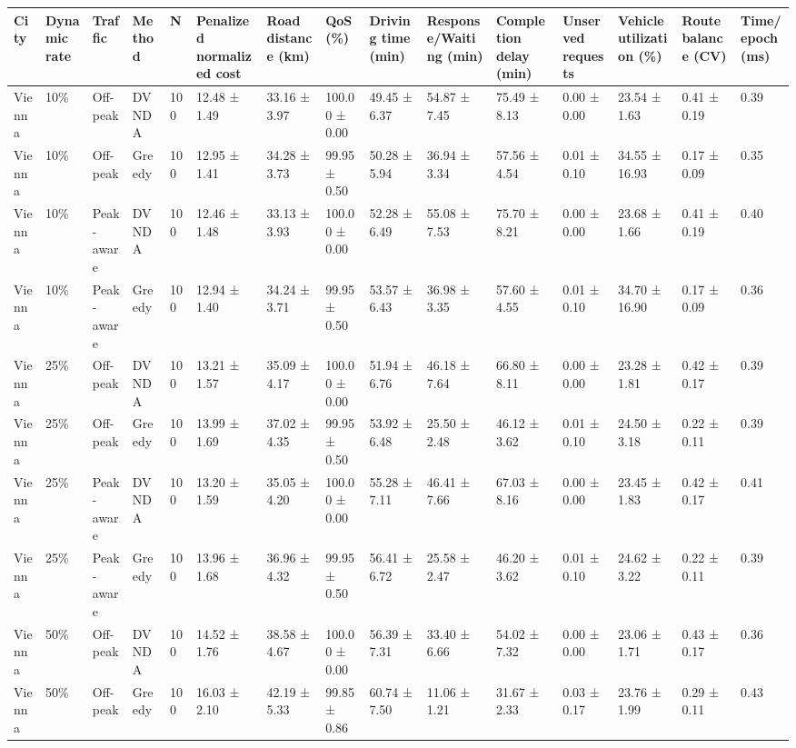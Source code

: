 \begin{tabular}{lllllllllllllll}
\hline
City & Dynamic rate & Traffic & Method & N & Penalized normalized cost & Road distance (km) & QoS (\%) & Driving time (min) & Response/Waiting (min) & Completion delay (min) & Unserved requests & Vehicle utilization (\%) & Route balance (CV) & Time/epoch (ms) \\
\hline
Vienna & 10\% & Off-peak & DVNDA & 100 & 12.48 ± 1.49 & 33.16 ± 3.97 & 100.00 ± 0.00 & 49.45 ± 6.37 & 54.87 ± 7.45 & 75.49 ± 8.13 & 0.00 ± 0.00 & 23.54 ± 1.63 & 0.41 ± 0.19 & 0.39 \\
Vienna & 10\% & Off-peak & Greedy & 100 & 12.95 ± 1.41 & 34.28 ± 3.73 & 99.95 ± 0.50 & 50.28 ± 5.94 & 36.94 ± 3.34 & 57.56 ± 4.54 & 0.01 ± 0.10 & 34.55 ± 16.93 & 0.17 ± 0.09 & 0.35 \\
Vienna & 10\% & Peak-aware & DVNDA & 100 & 12.46 ± 1.48 & 33.13 ± 3.93 & 100.00 ± 0.00 & 52.28 ± 6.49 & 55.08 ± 7.53 & 75.70 ± 8.21 & 0.00 ± 0.00 & 23.68 ± 1.66 & 0.41 ± 0.19 & 0.40 \\
Vienna & 10\% & Peak-aware & Greedy & 100 & 12.94 ± 1.40 & 34.24 ± 3.71 & 99.95 ± 0.50 & 53.57 ± 6.43 & 36.98 ± 3.35 & 57.60 ± 4.55 & 0.01 ± 0.10 & 34.70 ± 16.90 & 0.17 ± 0.09 & 0.36 \\
Vienna & 25\% & Off-peak & DVNDA & 100 & 13.21 ± 1.57 & 35.09 ± 4.17 & 100.00 ± 0.00 & 51.94 ± 6.76 & 46.18 ± 7.64 & 66.80 ± 8.11 & 0.00 ± 0.00 & 23.28 ± 1.81 & 0.42 ± 0.17 & 0.39 \\
Vienna & 25\% & Off-peak & Greedy & 100 & 13.99 ± 1.69 & 37.02 ± 4.35 & 99.95 ± 0.50 & 53.92 ± 6.48 & 25.50 ± 2.48 & 46.12 ± 3.62 & 0.01 ± 0.10 & 24.50 ± 3.18 & 0.22 ± 0.11 & 0.39 \\
Vienna & 25\% & Peak-aware & DVNDA & 100 & 13.20 ± 1.59 & 35.05 ± 4.20 & 100.00 ± 0.00 & 55.28 ± 7.11 & 46.41 ± 7.66 & 67.03 ± 8.16 & 0.00 ± 0.00 & 23.45 ± 1.83 & 0.42 ± 0.17 & 0.41 \\
Vienna & 25\% & Peak-aware & Greedy & 100 & 13.96 ± 1.68 & 36.96 ± 4.32 & 99.95 ± 0.50 & 56.41 ± 6.72 & 25.58 ± 2.47 & 46.20 ± 3.62 & 0.01 ± 0.10 & 24.62 ± 3.22 & 0.22 ± 0.11 & 0.39 \\
Vienna & 50\% & Off-peak & DVNDA & 100 & 14.52 ± 1.76 & 38.58 ± 4.67 & 100.00 ± 0.00 & 56.39 ± 7.31 & 33.40 ± 6.66 & 54.02 ± 7.32 & 0.00 ± 0.00 & 23.06 ± 1.71 & 0.43 ± 0.17 & 0.36 \\
Vienna & 50\% & Off-peak & Greedy & 100 & 16.03 ± 2.10 & 42.19 ± 5.33 & 99.85 ± 0.86 & 60.74 ± 7.50 & 11.06 ± 1.21 & 31.67 ± 2.33 & 0.03 ± 0.17 & 23.76 ± 1.99 & 0.29 ± 0.11 & 0.43 \\

\end{tabular}
